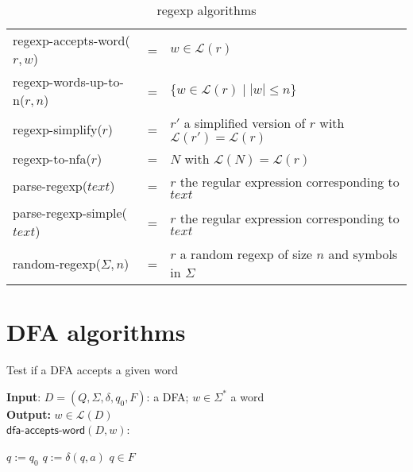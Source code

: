 \documentclass[11pt]{article}
\newcommand*{\Language}[1]{\ensuremath{\mathcal{L}(#1)}}
\begin{document}
\begin{table}[h!]
\begin{tabular}{ |lll| } 
\hline
\textsf{regexp-accepts-word}($r,w$) & = & $w \in \Language{r}$ \\
\textsf{regexp-words-up-to-n}($r,n$) & = & $\{ w \in \Language{r} \mid |w| \leq n \}$ \\
\textsf{regexp-simplify}($r$) & = & $r'$ a simplified version of $r$ with $\Language{r'} = \Language{r}$ \\
\textsf{regexp-to-nfa}($r$) & = & $N$ with $\Language{N} = \Language{r}$ \\
\textsf{parse-regexp}($text$) & = & $r$ the regular expression corresponding to $text$ \\
\textsf{parse-regexp-simple}($text$) & = & $r$ the regular expression corresponding to $text$ \\
\textsf{random-regexp}($\Sigma, n$) & = & $r$ a random regexp of size $n$ and symbols in $\Sigma$ \\
\hline
\end{tabular}
\caption{regexp algorithms}
\label{table:regexp-algorithms}
\end{table}

\clearpage

\section{DFA algorithms}

\begin{algorithm}
\small
\caption{Test if a DFA accepts a given word }
\vspace*{1ex}
{\textbf{Input}:} 
$D = (Q, \Sigma, \delta, q_0, F)$: a DFA; $w \in \Sigma^*$ a word \\
\textbf{Output:}
$w \in \Language{D}$ \\

$\textsf{dfa-accepts-word}(D, w)$:
\begin{algorithmic}[1]
\State $q := q_0$
  \State $q := \delta(q, a)$
\EndFor
\State \Return $q \in F$
\end{algorithmic}
\end{algorithm}
\end{document}
